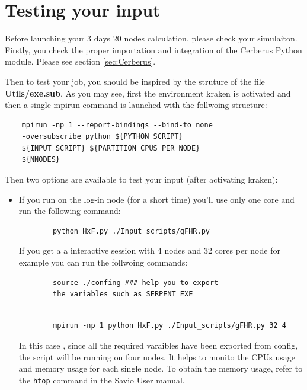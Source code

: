 \documentclass{article}
\begin{document}
\section{Testing your input}

Before launching your 3 days 20 nodes calculation, please check your simulaiton. Firstly, you check the proper importation and integration of the Cerberus Python module. Please see section \ref{sec:Cerberus}.

Then to test your job, you should be inspired by the struture of the file \textbf{Utils/exe.sub}. As you may see, first the environment kraken is activated and then a single mpirun command is launched with the follwoing structure: 
\begin{verbatim}
    mpirun -np 1 --report-bindings --bind-to none 
    -oversubscribe python ${PYTHON_SCRIPT} 
    ${INPUT_SCRIPT} ${PARTITION_CPUS_PER_NODE} 
    ${NNODES}
\end{verbatim}
Then two options are available to test your input (after activating kraken):
\begin{itemize}
    \item If you run on the log-in node (for a short time) you'll use only one core and run the following command:
    \begin{verbatim}
        python HxF.py ./Input_scripts/gFHR.py
    \end{verbatim}
    \iten If you get a a interactive session with 4 nodes and 32 cores per node for example you can run the follwoing commands:
    \begin{verbatim}
        source ./confing ### help you to export 
        the variables such as SERPENT_EXE
        
    \end{verbatim}
    \begin{verbatim}
        mpirun -np 1 python HxF.py ./Input_scripts/gFHR.py 32 4
    \end{verbatim}
In this case , since all the required varaibles have been exported from config, the script will be running on four nodes. It helps to monito the CPUs usage and memory usage for each single node. To obtain the memory usage, refer to the \texttt{htop} command in the Savio User manual.
\end{itemize}
\newpage
\end{document}
